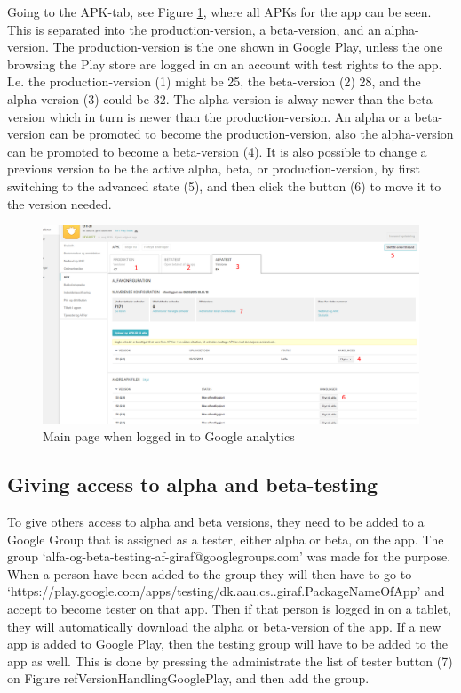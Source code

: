 Going to the APK-tab, see Figure \ref{VersionHandlingGooglePlay}, where all APKs for the app can be seen. This is separated into the production-version, a beta-version, and an alpha-version. The production-version is the one shown in Google Play, unless the one browsing the Play store are logged in on an account with test rights to the app. I.e. the production-version (1) might be 25, the beta-version (2) 28, and the alpha-version (3) could be 32. The alpha-version is alway newer than the beta-version which in turn is newer than the production-version. An alpha or a beta-version can be promoted to become the production-version, also the alpha-version can be promoted to become a beta-version (4).
It is also possible to change a previous version to be the active alpha, beta, or production-version, by first switching to the advanced state (5), and then click the button (6) to move it to the version needed.

\begin{figure}[H]
	\centering
	\includegraphics[width=0.8 \textwidth]{pictures/VersionHandlingGooglePlay.png}
	\caption{Main page when logged in to Google analytics}
	\label{VersionHandlingGooglePlay}
\end{figure}

\subsection{Giving access to alpha and beta-testing}
To give others access to alpha and beta versions, they need to be added to a Google Group that is assigned as a tester, either alpha or beta, on the app. The group ‘alfa-og-beta-testing-af-giraf@googlegroups.com’ was made for the purpose. When a person have been added to the group they will then have to go to ‘https://play.google.com/apps/testing/dk.aau.cs..giraf.PackageNameOfApp’ and accept to become tester on that app. Then if that person is logged in on a tablet, they will automatically download the alpha or beta-version of the app.
If a new app is added to Google Play, then the testing group will have to be added to the app as well. This is done by pressing the administrate the list of tester button (7) on Figure ref{VersionHandlingGooglePlay}, and then add the group.

